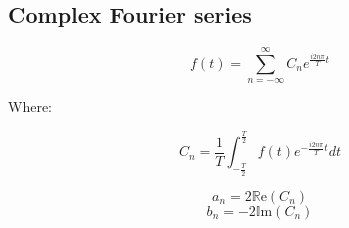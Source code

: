 \documentclass[letterpaper]{article}
\newcommand{\divline}{\noindent\makebox[\linewidth]{\rule{\textwidth}{0.4pt}}}
\begin{document}
        \divline

        \begin{multicols}{2}

            \section{Complex Fourier series}

                \[f(t) = \sum_{n = - \infty}^{\infty} C_{n} e^{\frac{i2n\pi}{T} t} \]

                Where:

                \[C_{n} = \frac{1}{T} \int_{-\frac{T}{2}}^{\frac{T}{2}} f(t) e^{-\frac{i2n\pi}{T}t} dt \]

                \[a_{n} = 2 \mathbb{R}\text{e}(C_{n})\]
                \[b_{n} = - 2 \mathbb{I}\text{m}(C_{n})\]

        \end{multicols}
 
	\divline
 
\end{document}
